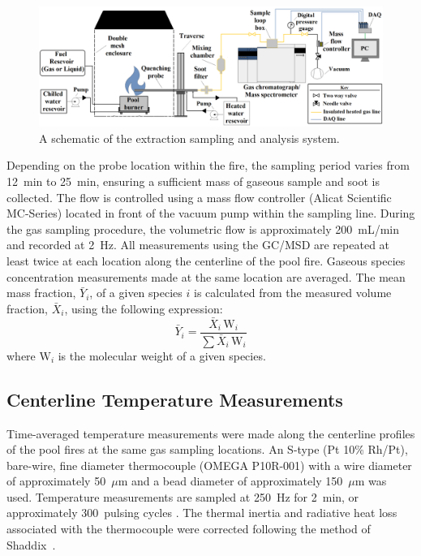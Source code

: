 \documentclass[preprint,review,12pt]{elsarticle}
\begin{document}
\begin{figure}
	\centering
\includegraphics[width=14.4 cm,keepaspectratio]{Experimental_Setup.png}
	\caption[A schematic of the gas sampling procedure]{A schematic of the extraction sampling and analysis system.}
	\label{fig:Experimental_Setup}
\end{figure}
Depending on the probe location within the fire, the sampling period varies from \SI{12}{min} to \SI{25}{min}, ensuring a sufficient mass of gaseous sample and soot is collected. The flow is controlled using a mass flow controller (Alicat Scientific MC-Series) located in front of the vacuum pump within the sampling line. During the gas sampling procedure, the volumetric flow is approximately 200~mL/min and recorded at \SI{2}{\hertz}. All measurements using the GC/MSD are repeated at least twice at each location along the centerline of the pool fire. Gaseous species concentration measurements made at the same location are averaged. The mean mass fraction, $\bar{Y}_{i}$, of a given species $i$ is calculated from the measured volume fraction, $\bar{X}_{i}$, using the following expression:
\begin{equation}\label{eq:mass_fraction}
	\bar{Y}_{i}=\frac{\bar{X}_{i} \, {\textrm{W}_{i}}}{\sum{\bar{X}_{i} \, {\textrm{W}_{i}}}}
\end{equation}
where ${{\textrm{W}_{i}}}$ is the molecular weight of a given species.

\subsection{Centerline Temperature Measurements}
\label{ssec:Temperature_Measurements}
Time-averaged temperature measurements were made along the centerline profiles of the pool fires at the same gas sampling locations. An S-type (Pt 10\% Rh/Pt), bare-wire, fine diameter thermocouple (OMEGA P10R-001) with a wire diameter of approximately 50~$\mu$m and a bead diameter of approximately 150~$\mu$m was used. Temperature measurements are sampled at \SI{250}{Hz} for \SI{2}{min}, or approximately 300~pulsing cycles \cite{Wang2019}. The thermal inertia and radiative heat loss associated with the thermocouple were corrected following the method of Shaddix~\cite{Shaddix1999}. 
\end{document}
